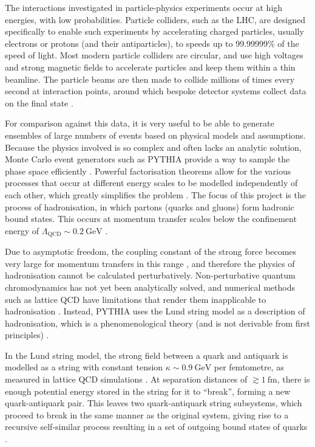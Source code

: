 \documentclass[12pt,a4paper]{report}
\begin{document}
The interactions investigated in particle-physics experiments occur at high energies, with low probabilities. Particle colliders, such as the LHC, are designed specifically to enable such experiments by accelerating charged particles, usually electrons or protons (and their antiparticles), to speeds up to 99.99999\% of the speed of light. Most modern particle colliders are circular, and use high voltages and strong magnetic fields to accelerate particles and keep them within a thin beamline. The particle beams are then made to collide millions of times every second at interaction points, around which bespoke detector systems collect data on the final state \cite{navas_review_2024, evans_lhc_2008, ellis_qcd_1996}.

For comparison against this data, it is very useful to be able to generate ensembles of large numbers of events based on physical models and assumptions. Because the physics involved is so complex and often lacks an analytic solution, Monte Carlo event generators such as PYTHIA provide a way to sample the phase space efficiently \cite{navas_review_2024, Bierlich:2022pfr, Buckley:2011ms, Skands:2012ts}. Powerful factorisation theorems allow for the various processes that occur at different energy scales to be modelled independently of each other, which greatly simplifies the problem \cite{Collins:1981uw, Skands:2012ts}. The focus of this project is the process of hadronisation, in which partons (quarks and gluons) form hadronic bound states. This occurs at momentum transfer scales below the confinement energy of $\Lambda_\text{QCD} \sim \qty{0.2}{\giga\electronvolt}$ \cite{Skands:2012ts}.

Due to asymptotic freedom, the coupling constant of the strong force becomes very large for momentum transfers in this range \cite{Gross:1973ju,Politzer:1974fr}, and therefore the physics of hadronisation cannot be calculated perturbatively. Non-perturbative quantum chromodynamics has not yet been analytically solved, and numerical methods such as lattice QCD have limitations that render them inapplicable to hadronisation \cite{Salam:2010zt}. Instead, PYTHIA uses the Lund string model as a description of hadronisation, which is a phenomenological theory (and is not derivable from first principles) \cite{Bierlich:2022pfr,Andersson:1983ia}.

In the Lund string model, the strong field between a quark and antiquark is modelled as a string with constant tension $\kappa \sim \qty{0.9}{\giga\electronvolt}$ per femtometre, as measured in lattice QCD simulations \cite{Bali:1992ab,Skands:2012ts}. At separation distances of $\gtrsim \qty{1}{\femto\meter}$, there is enough potential energy stored in the string for it to ``break'', forming a new quark-antiquark pair. This leaves two quark-antiquark string subsystems, which proceed to break in the same manner as the original system, giving rise to a recursive self-similar process resulting in a set of outgoing bound states of quarks \cite{Andersson:1983ia,Andersson:1997xwk,Bierlich:2022pfr,Skands:2012ts}.
\end{document}

